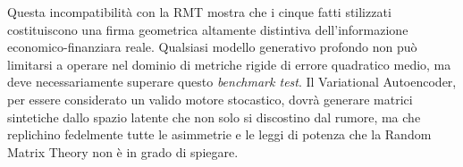 Questa incompatibilità con la RMT mostra che i cinque fatti stilizzati costituiscono una firma geometrica altamente distintiva dell'informazione economico-finanziara reale. Qualsiasi modello generativo profondo non può limitarsi a operare nel dominio di metriche rigide di errore quadratico medio, ma deve necessariamente superare questo \emph{benchmark test}. Il Variational Autoencoder, per essere considerato un valido motore stocastico, dovrà generare matrici sintetiche dallo spazio latente che non solo si discostino dal rumore, ma che replichino fedelmente tutte le asimmetrie e le leggi di potenza che la Random Matrix Theory non è in grado di spiegare.